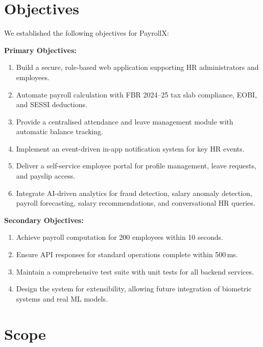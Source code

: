 \documentclass[12pt,a4paper]{report}
\begin{document}
\section{Objectives}

We established the following objectives for PayrollX:

\textbf{Primary Objectives:}
\begin{enumerate}
    \item Build a secure, role-based web application supporting HR administrators and employees.
    \item Automate payroll calculation with FBR 2024--25 tax slab compliance, EOBI, and SESSI deductions.
    \item Provide a centralised attendance and leave management module with automatic balance tracking.
    \item Implement an event-driven in-app notification system for key HR events.
    \item Deliver a self-service employee portal for profile management, leave requests, and payslip access.
    \item Integrate AI-driven analytics for fraud detection, salary anomaly detection, payroll forecasting, salary recommendations, and conversational HR queries.
\end{enumerate}

\textbf{Secondary Objectives:}
\begin{enumerate}
    \item Achieve payroll computation for 200 employees within 10 seconds.
    \item Ensure API responses for standard operations complete within 500\,ms.
    \item Maintain a comprehensive test suite with unit tests for all backend services.
    \item Design the system for extensibility, allowing future integration of biometric systems and real ML models.
\end{enumerate}

\section{Scope}
\end{document}

